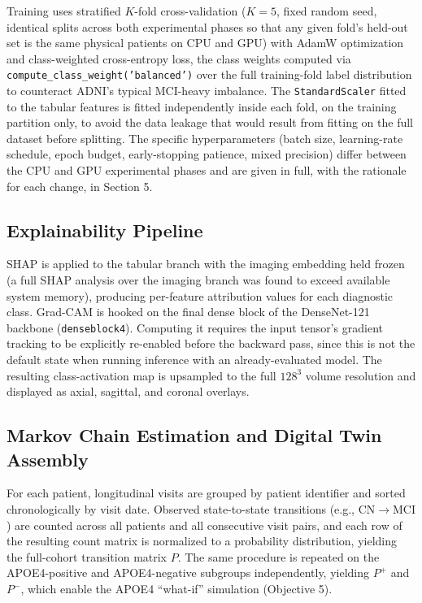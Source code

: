 \documentclass[pdflatex,sn-mathphys-num]{sn-jnl}%
\theoremstyle{thmstyleone}%
\theoremstyle{thmstyletwo}%
\theoremstyle{thmstylethree}%
\begin{document}
Training uses stratified $K$-fold cross-validation ($K=5$, fixed random seed, identical splits across both experimental phases so that any given fold's held-out set is the same physical patients on CPU and GPU) with AdamW optimization and class-weighted cross-entropy loss, the class weights computed via \texttt{compute\_class\_weight('balanced')} over the full training-fold label distribution to counteract ADNI's typical MCI-heavy imbalance. The \texttt{StandardScaler} fitted to the tabular features is fitted independently inside each fold, on the training partition only, to avoid the data leakage that would result from fitting on the full dataset before splitting. The specific hyperparameters (batch size, learning-rate schedule, epoch budget, early-stopping patience, mixed precision) differ between the CPU and GPU experimental phases and are given in full, with the rationale for each change, in Section 5.

\subsection{Explainability Pipeline}\label{sec3_6}

SHAP is applied to the tabular branch with the imaging embedding held frozen (a full SHAP analysis over the imaging branch was found to exceed available system memory), producing per-feature attribution values for each diagnostic class. Grad-CAM is hooked on the final dense block of the DenseNet-121 backbone (\texttt{denseblock4}). Computing it requires the input tensor's gradient tracking to be explicitly re-enabled before the backward pass, since this is not the default state when running inference with an already-evaluated model. The resulting class-activation map is upsampled to the full $128^3$ volume resolution and displayed as axial, sagittal, and coronal overlays.

\subsection{Markov Chain Estimation and Digital Twin Assembly}\label{sec3_7}

For each patient, longitudinal visits are grouped by patient identifier and sorted chronologically by visit date. Observed state-to-state transitions (e.g., $\mathrm{CN} \rightarrow \mathrm{MCI}$) are counted across all patients and all consecutive visit pairs, and each row of the resulting count matrix is normalized to a probability distribution, yielding the full-cohort transition matrix $P$. The same procedure is repeated on the APOE4-positive and APOE4-negative subgroups independently, yielding $P^{+}$ and $P^{-}$, which enable the APOE4 ``what-if'' simulation (Objective 5).
\end{document}

